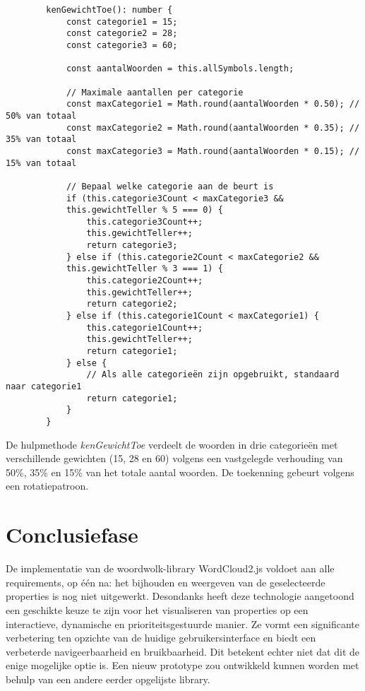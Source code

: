 \begin{listing}
    \begin{verbatim}
        kenGewichtToe(): number {
            const categorie1 = 15;
            const categorie2 = 28;
            const categorie3 = 60;
            
            const aantalWoorden = this.allSymbols.length;
            
            // Maximale aantallen per categorie
            const maxCategorie1 = Math.round(aantalWoorden * 0.50); // 50% van totaal
            const maxCategorie2 = Math.round(aantalWoorden * 0.35); // 35% van totaal
            const maxCategorie3 = Math.round(aantalWoorden * 0.15); // 15% van totaal
            
            // Bepaal welke categorie aan de beurt is
            if (this.categorie3Count < maxCategorie3 &&
            this.gewichtTeller % 5 === 0) {
                this.categorie3Count++;
                this.gewichtTeller++;
                return categorie3;
            } else if (this.categorie2Count < maxCategorie2 &&
            this.gewichtTeller % 3 === 1) {
                this.categorie2Count++;
                this.gewichtTeller++;
                return categorie2;
            } else if (this.categorie1Count < maxCategorie1) {
                this.categorie1Count++;
                this.gewichtTeller++;
                return categorie1;
            } else {
                // Als alle categorieën zijn opgebruikt, standaard naar categorie1
                return categorie1;
            }
        }
        \end{verbatim}
        \caption{De hulpmethode \textit{kenGewichtToe} verdeelt de woorden in drie categorieën met verschillende gewichten (15, 28 en 60) volgens een vastgelegde verhouding van 50\%, 35\% en 15\% van het totale aantal woorden. De toekenning gebeurt volgens een rotatiepatroon.}
        \label{code:kenGewichtToe}
    \end{listing}

\section{Conclusiefase}
De implementatie van de woordwolk-library WordCloud2.js voldoet aan alle requirements, op één na: het bijhouden en weergeven van de geselecteerde properties is nog niet uitgewerkt. Desondanks heeft deze technologie aangetoond een geschikte keuze te zijn voor het visualiseren van properties op een interactieve, dynamische en prioriteitsgestuurde manier. Ze vormt een significante verbetering ten opzichte van de huidige gebruikersinterface en biedt een verbeterde navigeerbaarheid en bruikbaarheid. Dit betekent echter niet dat dit de enige mogelijke optie is. Een nieuw prototype zou ontwikkeld kunnen worden met behulp van een andere eerder opgelijste library.
